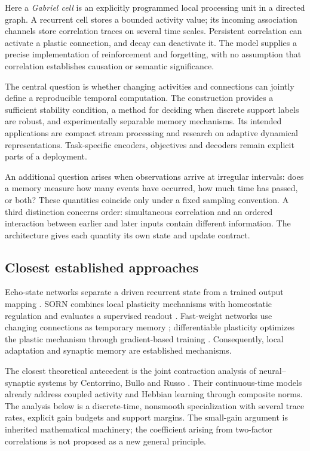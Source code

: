 \documentclass[11pt,a4paper]{article}
\theoremstyle{definition}\newtheorem{definition}[theorem]{Definition}
\begin{document}
Here a \emph{Gabriel cell} is an explicitly programmed local processing unit in a directed graph. A recurrent cell stores a bounded activity value; its incoming association channels store correlation traces on several time scales. Persistent correlation can activate a plastic connection, and decay can deactivate it. The model supplies a precise implementation of reinforcement and forgetting, with no assumption that correlation establishes causation or semantic significance.

The central question is whether changing activities and connections can jointly define a reproducible temporal computation. The construction provides a sufficient stability condition, a method for deciding when discrete support labels are robust, and experimentally separable memory mechanisms. Its intended applications are compact stream processing and research on adaptive dynamical representations. Task-specific encoders, objectives and decoders remain explicit parts of a deployment.

An additional question arises when observations arrive at irregular intervals: does a memory measure how many events have occurred, how much time has passed, or both? These quantities coincide only under a fixed sampling convention. A third distinction concerns order: simultaneous correlation and an ordered interaction between earlier and later inputs contain different information. The architecture gives each quantity its own state and update contract.

\subsection{Closest established approaches}
Echo-state networks separate a driven recurrent state from a trained output mapping \cite{jaeger2001}. SORN combines local plasticity mechanisms with homeostatic regulation and evaluates a supervised readout \cite{lazar2009}. Fast-weight networks use changing connections as temporary memory \cite{ba2016}; differentiable plasticity optimizes the plastic mechanism through gradient-based training \cite{miconi2018}. Consequently, local adaptation and synaptic memory are established mechanisms.

The closest theoretical antecedent is the joint contraction analysis of neural--synaptic systems by Centorrino, Bullo and Russo \cite{centorrino2024}. Their continuous-time models already address coupled activity and Hebbian learning through composite norms. The analysis below is a discrete-time, nonsmooth specialization with several trace rates, explicit gain budgets and support margins. The small-gain argument is inherited mathematical machinery; the coefficient arising from two-factor correlations is not proposed as a new general principle.
\end{document}
